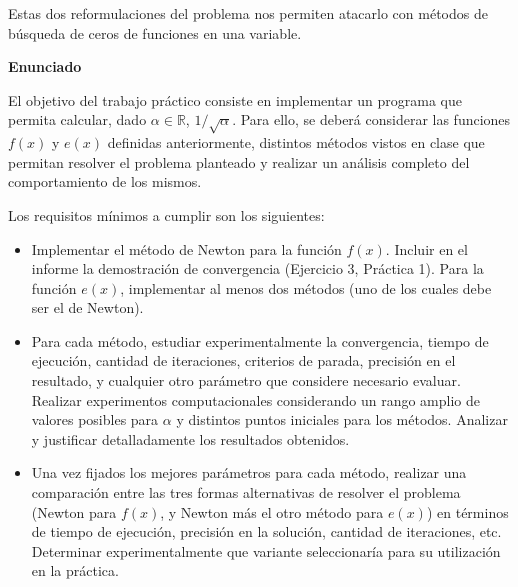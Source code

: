 Estas dos reformulaciones del problema nos permiten atacarlo con m\'etodos de b\'usqueda de ceros de funciones en una
variable.

\textbf{Enunciado}

El objetivo del trabajo pr\'actico consiste en implementar un programa que permita calcular, dado $\alpha \in
\mathbb{R}$, $1/\sqrt{\alpha}$. Para ello, se deber\'a considerar las funciones $f(x)$ y $e(x)$ definidas
anteriormente, distintos m\'etodos vistos en clase que permitan resolver el problema planteado y realizar un an\'alisis
completo del comportamiento de los mismos. 

Los requisitos m\'inimos a cumplir son los siguientes:

\begin{itemize}
\item Implementar el m\'etodo de Newton para la funci\'on $f(x)$. Incluir en el informe la demostraci\'on de
convergencia (Ejercicio 3, Pr\'actica 1). Para la funci\'on $e(x)$, implementar al menos dos m\'etodos (uno de los
cuales debe ser el de Newton).   
\item Para cada m\'etodo, estudiar experimentalmente la convergencia, tiempo de ejecuci\'on, cantidad de iteraciones,
criterios de parada, precisi\'on en el resultado, y cualquier otro par\'ametro que considere necesario evaluar. Realizar experimentos
computacionales considerando un rango amplio de valores posibles para $\alpha$ y distintos puntos iniciales
para los m\'etodos. Analizar y justificar detalladamente los resultados obtenidos.
\item Una vez fijados los mejores par\'ametros para cada m\'etodo, realizar una comparaci\'on entre las tres formas
alternativas de resolver el problema (Newton para $f(x)$, y Newton m\'as el otro m\'etodo para $e(x)$) en t\'erminos de
tiempo de ejecuci\'on, precisi\'on en la soluci\'on, cantidad de iteraciones, etc. Determinar experimentalmente que
variante seleccionar\'ia para su utilizaci\'on en la pr\'actica.
\end{itemize}
